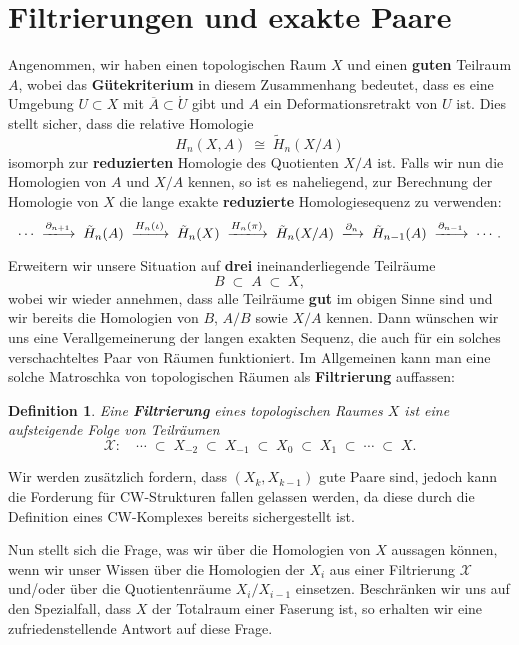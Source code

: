 \documentclass[12pt]{article}
\numberwithin{conj}{section}
\newtheorem{definition}[conj]{Definition}
\begin{document}
    \section{Filtrierungen und exakte Paare}
    Angenommen, wir haben einen topologischen Raum $X$ und einen \textbf{guten} Teilraum
    $A$, wobei das \textbf{Gütekriterium} in diesem Zusammenhang bedeutet, dass es
    eine Umgebung $U \subset X$ mit $\overline{A} \subset \mathring{U}$ gibt und
    $A$ ein Deformationsretrakt von $U$ ist. Dies stellt sicher, dass die relative
    Homologie
    \[
        H_{n}(X,A) \;\cong\; \tilde{H}_{n}(X/A) 
    \]
    isomorph zur \textbf{reduzierten} Homologie des Quotienten $X/A$ ist. Falls
    wir nun die Homologien von $A$ und $X/A$ kennen, so ist es naheliegend, zur
    Berechnung der Homologie von $X$ die lange exakte \textbf{reduzierte} Homologiesequenz
    zu verwenden:
    \[
        \cdots \;\xlongrightarrow{\partial_{n+1}}\; \tilde{H}_{n}(A) \;\xlongrightarrow{H_n(\iota)}\; \tilde{H}_{n}
        (X) \;\xlongrightarrow{H_n(\pi)}\; \tilde{H}_{n}(X/A)  \;\xlongrightarrow{\partial_n}\; \tilde
        {H}_{n-1}(A) \;\xlongrightarrow{\partial_{n-1}}\; \cdots
        .
    \]

    Erweitern wir unsere Situation auf \textbf{drei} ineinanderliegende Teilräume
    \[
        B \;\subset\; A \;\subset\; X,
    \]
    wobei wir wieder annehmen, dass alle Teilräume \textbf{gut} im obigen Sinne
    sind und wir bereits die Homologien von $B$, $A/B$ sowie $X/A$ kennen. Dann
    wünschen wir uns eine Verallgemeinerung der langen exakten Sequenz, die auch für
    ein solches verschachteltes Paar von Räumen funktioniert. Im Allgemeinen kann
    man eine solche Matroschka von topologischen Räumen als \textbf{Filtrierung}
    auffassen:

    \begin{definition}
        Eine \textbf{Filtrierung} eines topologischen Raumes $X$ ist eine
        aufsteigende Folge von Teilräumen
        \[
            \mathcal{X}:\quad \cdots \;\subset\; X_{-2}\;\subset\; X_{-1}\;\subset\; X_{0}
            \;\subset\; X_{1}\;\subset\; \cdots \;\subset\; X.
        \]
    \end{definition}

    Wir werden zusätzlich fordern, dass $(X_k,X_{k-1})$ gute Paare sind, jedoch kann die Forderung für CW-Strukturen fallen gelassen werden, da diese durch die Definition eines CW-Komplexes bereits sichergestellt ist.

    Nun stellt sich die Frage, was wir über die Homologien von $X$ aussagen können,
    wenn wir unser Wissen über die Homologien der $X_{i}$ aus einer Filtrierung $\mathcal{X}$
    und/oder über die Quotientenräume $X_{i}/X_{i-1}$ einsetzen. Beschränken wir
    uns auf den Spezialfall, dass $X$ der Totalraum einer Faserung ist, so
    erhalten wir eine zufriedenstellende Antwort auf diese Frage.
\end{document}
